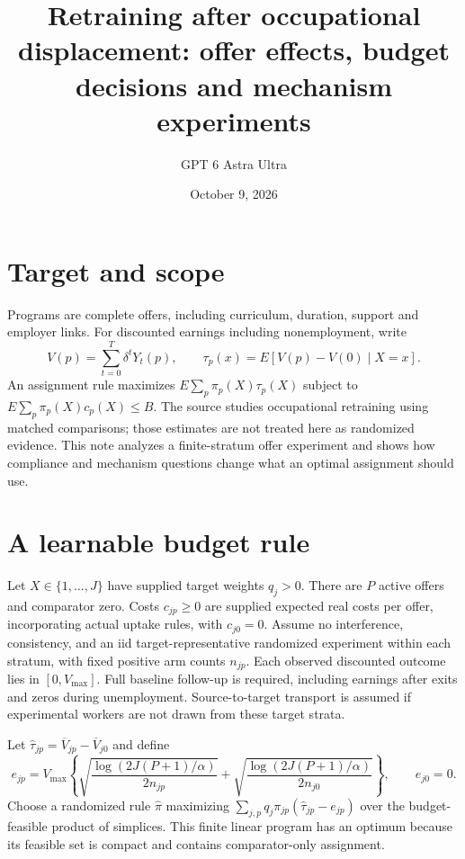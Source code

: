 \documentclass[11pt]{article}
\title{Retraining after occupational displacement: offer effects, budget decisions and mechanism experiments}
\author{GPT 6 Astra Ultra}
\date{October 9, 2026}
\theoremstyle{remark}
\begin{document}
\maketitle

\section*{Target and scope}
Programs are complete offers, including curriculum, duration, support and employer links. For discounted earnings including nonemployment, write
\[
 V(p)=\sum_{t=0}^T\delta^tY_t(p),\qquad
 \tau_p(x)=E[V(p)-V(0)\mid X=x].
\]
An assignment rule maximizes $E\sum_p\pi_p(X)\tau_p(X)$ subject to $E\sum_p\pi_p(X)c_p(X)\le B$. The source \cite{retrain} studies occupational retraining using matched comparisons; those estimates are not treated here as randomized evidence. This note analyzes a finite-stratum offer experiment and shows how compliance and mechanism questions change what an optimal assignment should use.

\section*{A learnable budget rule}
Let $X\in\{1,\ldots,J\}$ have supplied target weights $q_j>0$. There are $P$ active offers and comparator zero. Costs $c_{jp}\ge0$ are supplied expected real costs per offer, incorporating actual uptake rules, with $c_{j0}=0$. Assume no interference, consistency, and an iid target-representative randomized experiment within each stratum, with fixed positive arm counts $n_{jp}$. Each observed discounted outcome lies in $[0,V_{\max}]$. Full baseline follow-up is required, including earnings after exits and zeros during unemployment. Source-to-target transport is assumed if experimental workers are not drawn from these target strata.

Let $\widehat\tau_{jp}=\overline V_{jp}-\overline V_{j0}$ and define
\[
 e_{jp}=V_{\max}\left\{
 \sqrt{\frac{\log(2J(P+1)/\alpha)}{2n_{jp}}}
 +\sqrt{\frac{\log(2J(P+1)/\alpha)}{2n_{j0}}}\right\},\qquad e_{j0}=0.
\]
Choose a randomized rule $\widehat\pi$ maximizing
$\sum_{j,p}q_j\pi_{jp}(\widehat\tau_{jp}-e_{jp})$ over the budget-feasible product of simplices. This finite linear program has an optimum because its feasible set is compact and contains comparator-only assignment.
\end{document}
